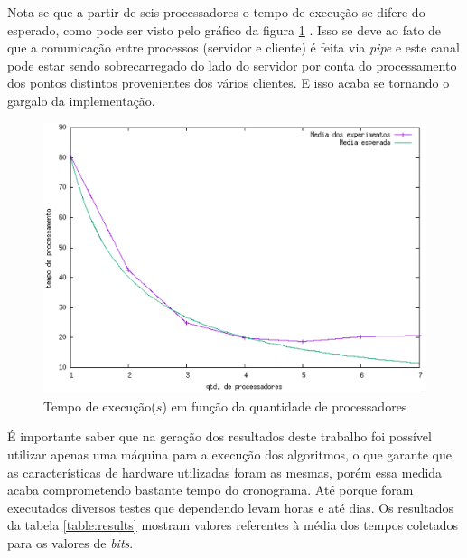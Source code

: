 Nota-se que a partir de seis processadores o tempo de execução se difere do esperado, como pode ser visto pelo gráfico da figura \ref{graph:average}
. Isso se deve ao fato de que a comunicação entre processos (servidor e cliente) é feita via \textit{pipe} e este canal pode estar sendo sobrecarregado do lado do servidor por conta do processamento dos pontos distintos provenientes dos vários clientes. E isso acaba se tornando o gargalo da implementação.

\begin{figure}[h]
\centering
\includegraphics[scale=0.6, bb=0 0 515 478]{figuras/average.eps}
\caption{Tempo de execução($s$) em função da quantidade de processadores}
\label{graph:average}
\end{figure}

É importante saber que na geração dos resultados deste trabalho foi possível utilizar apenas uma máquina para a execução dos algoritmos, o que garante que as características de hardware utilizadas foram as mesmas, porém essa medida acaba comprometendo bastante tempo do cronograma. Até porque foram executados diversos testes que dependendo levam horas e até dias. Os resultados da tabela \ref{table:results} mostram valores referentes à média dos tempos coletados para os valores de \textit{bits}.
